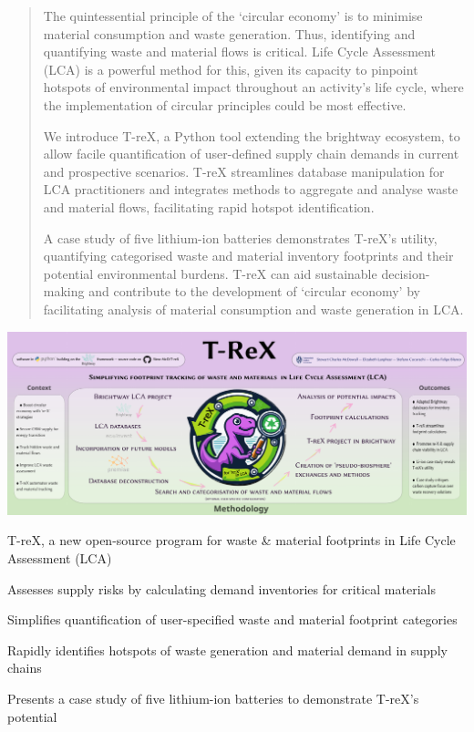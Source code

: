 \documentclass[a4paper,fleqn]{cas-dc}
\begin{document}
\begin{abstract}
        The quintessential principle of the `circular economy' is to minimise material consumption and waste generation. Thus, identifying and quantifying waste and material flows is critical. Life Cycle Assessment (LCA) is a powerful method for this, given its capacity to pinpoint hotspots of environmental impact throughout an activity's life cycle, where the implementation of circular principles could be most effective.

We introduce T-reX, a Python tool extending the brightway ecosystem, to allow facile quantification of user-defined supply chain demands in current and prospective scenarios. T-reX streamlines database manipulation for LCA practitioners and integrates methods to aggregate and analyse waste and material flows, facilitating rapid hotspot identification.

A case study of five lithium-ion batteries demonstrates T-reX's utility, quantifying categorised waste and material inventory footprints and their potential environmental burdens. T-reX can aid sustainable decision-making and contribute to the development of `circular economy' by facilitating analysis of material consumption and waste generation in LCA.
\end{abstract}

\begin{graphicalabstract}
	\includegraphics[width=1\columnwidth]{figs/grabs_T-reX_graphical-abstract.pdf}
\end{graphicalabstract}



\begin{highlights}
	\item T-reX, a new open-source program for waste \& material footprints in Life Cycle Assessment (LCA)
	\item Assesses supply risks by calculating demand inventories for critical materials
	\item Simplifies quantification of user-specified waste and material footprint categories
	\item Rapidly identifies hotspots of waste generation and material demand in supply	chains
	\item Presents a case study of five lithium-ion batteries to demonstrate T-reX's potential
\end{highlights}
\end{document}
